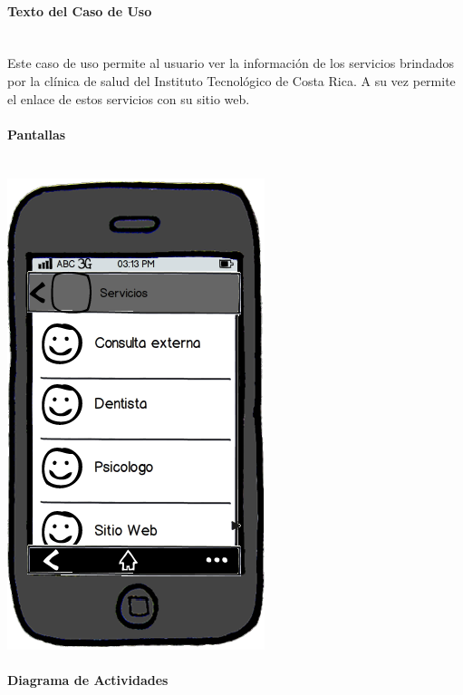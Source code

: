 \documentclass[12pt]{article}
\begin{document}
\paragraph{Texto del Caso de Uso}\ \\

Este caso de uso permite al usuario ver la informaci\'on de los servicios brindados por la cl\'inica de salud del Instituto Tecnol\'ogico de Costa Rica. A su vez permite el enlace de estos servicios con su sitio web.

\paragraph{Pantallas}\ \\

\includegraphics[scale=0.5]{"../Documentos/Diagramas/MockupServicios"}

\newpage
\paragraph{Diagrama de Actividades}\ \\
\end{document}
